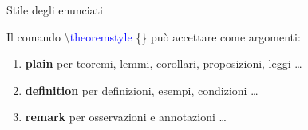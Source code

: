 \begin{frame}{Stile degli enunciati}

	Il comando \textbackslash \textcolor{blue}{theoremstyle} \{\} può accettare come argomenti:
	\begin{enumerate}
	  \item \textbf{plain} per teoremi, lemmi, corollari, proposizioni, leggi \dots
	  \item \textbf{definition} per definizioni, esempi, condizioni \dots
	  \item \textbf{remark} per osservazioni e annotazioni \dots
	\end{enumerate}

\end{frame}
